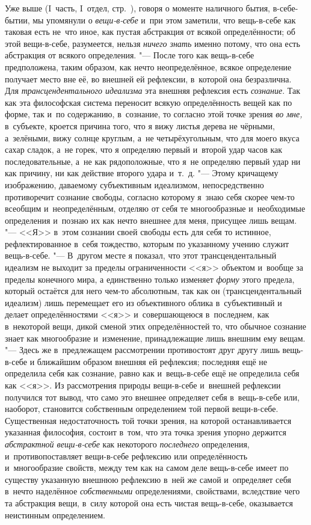 Уже выше (I~часть, I~отдел, стр.~\pageref{bkm:bmThingInItself}), говоря о
моменте наличного бытия, в-себе-бытии, мы упомянули о
{\em вещи-в-себе} и~при этом заметили, что вещь-в-себе
как таковая есть не~что иное, как пустая абстракция от всякой
определённости; об этой вещи-в-себе, разумеется, нельзя
{\em ничего знать} именно потому, что она есть
абстракция от всякого определения. "--- После того как вещь-в-себе
предположена, таким образом, как нечто неопределённое, всякое определение
получает место вне её, во внешней ей рефлексии, в~которой она безразлична.
Для {\em трансцендентального идеализма} эта внешняя
рефлексия есть {\em сознание}. Так как эта философская
система переносит всякую определённость вещей как по форме, так и~по
содержанию, в~сознание, то согласно этой точке зрения
{\em во мне,} в~субъекте, кроется причина того, что я
вижу листья дерева не чёрными, а~зелёными, вижу солнце круглым, а~не
четырёхугольным, что для моего вкуса сахар сладок, а~не горек, что я
определяю первый и~второй удар часов как последовательные, а~не как
рядоположные, что я~не определяю первый удар ни как причину, ни как
действие второго удара и~т.~д. "--- Этому кричащему изображению, даваемому
субъективным идеализмом, непосредственно противоречит сознание свободы,
согласно которому я~знаю себя скорее чем-то всеобщим и~неопределённым,
отделяю от себя те многообразные и~необходимые определения и~познаю их как
нечто внешнее для меня, присущее лишь вещам. "--- <<Я>> в~этом сознании своей
свободы есть для себя то истинное, рефлектированное в~себя тождество,
которым по указанному учению служит вещь-в-себе. "--- В~другом месте я
показал, что этот трансцендентальный идеализм не выходит за пределы
ограниченности <<я>> объектом и~вообще за пределы конечного мира, а
единственно только изменяет {\em форму} этого предела,
который остаётся для него чем-то абсолютным, так как он (трансцендентальный
идеализм) лишь перемещает его из объективного облика в~субъективный и
делает определённостями <<я>> и~совершающеюся в~последнем, как в~некоторой
вещи, дикой сменой этих определённостей то, что обычное сознание знает как
многообразие и~изменение, принадлежащие лишь внешним ему вещам. "--- Здесь же
в~предлежащем рассмотрении противостоят друг другу лишь вещь-в-себе и
ближайшим образом внешняя ей рефлексия; последняя ещё не определила себя
как сознание, равно как и~вещь-в-себе ещё не определила себя как <<я>>. Из
рассмотрения природы вещи-в-себе и~внешней рефлексии получился тот вывод,
что само это внешнее определяет себя в~вещь-в-себе или, наоборот,
становится собственным определением той первой вещи-в-себе. Существенная
недостаточность той точки зрения, на которой останавливается указанная
философия, состоит в~том, что эта точка зрения упорно держится
{\em абстрактной вещи-в-себе} как некоторого
{\em последнего} определения, и~противопоставляет
вещи-в-себе рефлексию или определённость и~многообразие свойств, между тем
как на самом деле вещь-в-себе имеет по существу указанную внешнюю рефлексию
в~ней же самой и~определяет себя в~нечто наделённое
{\em собственными} определениями, свойствами,
вследствие чего та абстракция вещи, в~силу которой она есть чистая
вещь-в-себе, оказывается неистинным определением.

